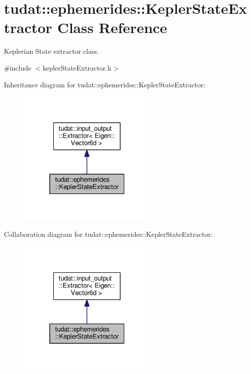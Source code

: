 \hypertarget{classtudat_1_1ephemerides_1_1KeplerStateExtractor}{}\section{tudat\+:\+:ephemerides\+:\+:Kepler\+State\+Extractor Class Reference}
\label{classtudat_1_1ephemerides_1_1KeplerStateExtractor}


Keplerian State extractor class.  




{\ttfamily \#include $<$kepler\+State\+Extractor.\+h$>$}



Inheritance diagram for tudat\+:\+:ephemerides\+:\+:Kepler\+State\+Extractor\+:
\nopagebreak
\begin{figure}[H]
\begin{center}
\leavevmode
\includegraphics[width=193pt]{classtudat_1_1ephemerides_1_1KeplerStateExtractor__inherit__graph}
\end{center}
\end{figure}


Collaboration diagram for tudat\+:\+:ephemerides\+:\+:Kepler\+State\+Extractor\+:
\nopagebreak
\begin{figure}[H]
\begin{center}
\leavevmode
\includegraphics[width=193pt]{classtudat_1_1ephemerides_1_1KeplerStateExtractor__coll__graph}
\end{center}
\end{figure}
